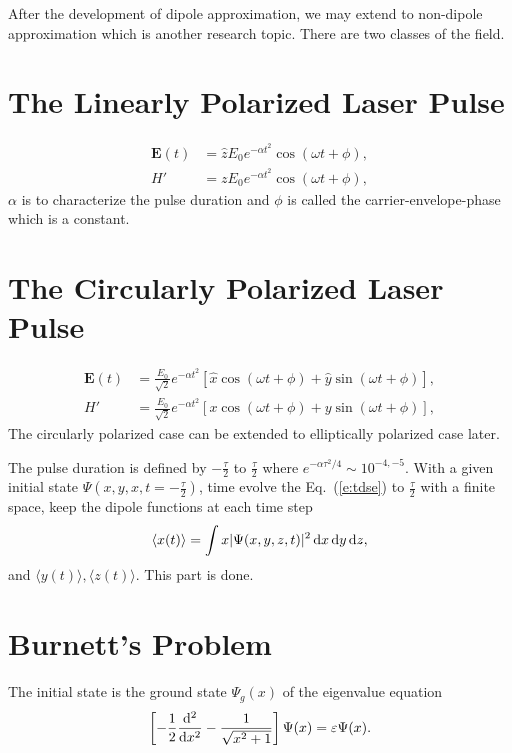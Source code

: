 \documentclass{isildur}
\begin{document}
After the development of dipole approximation, we may extend to non-dipole
approximation which is another research topic.  There are two classes of the
field.

\section{The Linearly Polarized Laser Pulse}

\begin{align}
  \mathbf{E}(t) &= {\hat z}E_0e^{-\alpha t^2}\cos(\omega t+\phi), \\
  H' &= zE_0e^{-\alpha t^2}\cos(\omega t+\phi),
\end{align}
%
$\alpha$ is to characterize the pulse duration and $\phi$ is called the
carrier-envelope-phase which is a constant.

\section{The Circularly Polarized Laser Pulse}

\begin{align}
  \mathbf{E}(t) &=
    \frac{E_0}{\sqrt 2}e^{-\alpha t^2}
    \left[
      {\hat x}\cos(\omega t+\phi)+{\hat y}\sin(\omega t+\phi)
    \right], \\
  H' &= \frac{E_0}{\sqrt 2}e^{-\alpha t^2}
    \left[
      x\cos(\omega t+\phi) + y\sin(\omega t+\phi)
    \right],
\end{align}
%
The circularly polarized case can be extended to elliptically polarized case
later.

The pulse duration is defined by $-\frac{\tau}{2}$ to $\frac{\tau}{2}$ where
$e^{-\alpha \tau^2/4}\sim 10^{-4,-5}$.  With a given initial state
$\Psi(x,y,x,t=-\frac{\tau}{2})$, time evolve the Eq.~(\ref{e:tdse}) to
$\frac{\tau}{2}$ with a finite space, keep the dipole functions at each time
step
%
\begin{align}
  \langle x(t) \rangle = \int x |\Psi(x,y,z,t)|^2 \mathop{}\!\mathrm{d} x \mathop{}\!\mathrm{d} y \mathop{}\!\mathrm{d} z,
\end{align}
%
and $\langle y(t) \rangle, \langle z(t) \rangle$.  This part is done.

\section{Burnett's Problem}

The initial state is the ground state $\Psi_g(x)$ of the eigenvalue equation
%
\begin{align}
  \left[ -\frac{1}{2}\frac{\mathop{}\!\mathrm{d}^2}{\mathop{}\!\mathrm{d} x^2}-\frac{1}{\sqrt{x^2+1}} \right]
  \Psi(x) = \varepsilon \Psi(x).
\end{align}
\end{document}
